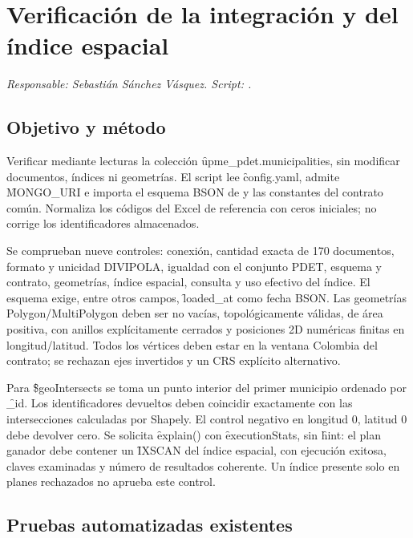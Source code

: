\section{Verificación de la integración y del índice espacial}\label{sec:verificacion}

\textit{Responsable: Sebastián Sánchez Vásquez. Script: .}

\subsection{Objetivo y método}

Verificar mediante lecturas la colección \f{upme\_pdet.municipalities}, sin modificar documentos, índices ni geometrías. El script lee \f{config.yaml}, admite \f{MONGO\_URI} e importa el esquema BSON de  y las constantes del contrato común. Normaliza los códigos del Excel de referencia con ceros iniciales; no corrige los identificadores almacenados.

Se comprueban nueve controles: conexión, cantidad exacta de 170 documentos, formato y unicidad DIVIPOLA, igualdad con el conjunto PDET, esquema y contrato, geometrías, índice espacial, consulta y uso efectivo del índice. El esquema exige, entre otros campos, \f{loaded\_at} como fecha BSON. Las geometrías Polygon/MultiPolygon deben ser no vacías, topológicamente válidas, de área positiva, con anillos explícitamente cerrados y posiciones 2D numéricas finitas en longitud/latitud. Todos los vértices deben estar en la ventana Colombia del contrato; se rechazan ejes invertidos y un CRS explícito alternativo.

Para \f{\$geoIntersects} se toma un punto interior del primer municipio ordenado por \f{\_id}. Los identificadores devueltos deben coincidir exactamente con las intersecciones calculadas por Shapely. El control negativo en longitud 0, latitud 0 debe devolver cero. Se solicita \f{explain()} con \f{executionStats}, sin \f{hint}: el plan ganador debe contener un \f{IXSCAN} del índice espacial, con ejecución exitosa, claves examinadas y número de resultados coherente. Un índice presente solo en planes rechazados no aprueba este control.

\subsection{Pruebas automatizadas existentes}

